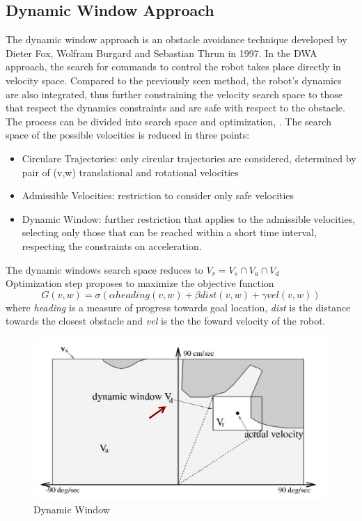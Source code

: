 \subsection{Dynamic Window Approach}
The dynamic window approach is an obstacle avoidance technique developed by Dieter Fox, Wolfram Burgard and Sebastian Thrun in 1997. 
In the DWA approach, the search for commands to control the robot takes place directly in velocity space. Compared to the previously seen method, the robot's dynamics are also integrated, thus further constraining the velocity search space to those that respect the dynamics constraints and are safe with respect to the obstacle.
The process can be divided into search space and optimization, \citet{fox1997}.
The search space of the possible velocities is reduced in three points:
    \begin{itemize}
        \item Circulare Trajectories: only circular trajectories are considered, determined by pair of (v,w) translational and rotational velocities
        \item Admissible Velocities: restriction to consider only safe velocities
        \item Dynamic Window: further restriction that applies to the admissible velocities, selecting only those that can be reached within a short time interval, respecting the constraints on acceleration.
    \end{itemize}
The dynamic windows search space reduces to $V_r = V_s \cap V_a \cap V_d$\\

Optimization step proposes to maximize the objective function
\begin{equation}
    G(v,w) = \sigma(\alpha heading(v,w) + \beta dist(v,w) + \gamma vel(v,w))
\end{equation}
where \textit{heading} is a measure of progress towards goal location, \textit{dist} is the distance towards the closest obstacle and \textit{vel} is the the foward velocity of the robot.
\begin{figure}[H]
    \centering
    \includegraphics[scale=0.75]{Images/Chapter 4/dynamic_window.jpg}
    \caption{Dynamic Window}
    \label{fig:dwa}
\end{figure}

